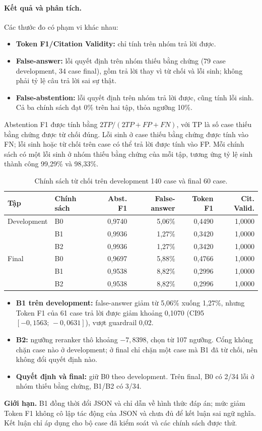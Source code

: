 \paragraph{Kết quả và phân tích.}
Các thước đo có phạm vi khác nhau:
\begin{itemize}
\item \textbf{Token F1/Citation Validity:} chỉ tính trên nhóm trả lời được.
\item \textbf{False-answer:} lỗi quyết định trên nhóm thiếu bằng chứng (79 case development, 34 case final), gồm trả lời thay vì từ chối và lỗi sinh; không phải tỷ lệ câu trả lời sai sự thật.
\item \textbf{False-abstention:} lỗi quyết định trên nhóm trả lời được, cũng tính lỗi sinh. Cả ba chính sách đạt 0\% trên hai tập, thỏa ngưỡng 10\%.
\end{itemize}

Abstention F1 được tính bằng $2TP/(2TP+FP+FN)$, với TP là số case thiếu bằng chứng được từ chối đúng. Lỗi sinh ở case thiếu bằng chứng được tính vào FN; lỗi sinh hoặc từ chối trên case có thể trả lời được tính vào FP. Mỗi chính sách có một lỗi sinh ở nhóm thiếu bằng chứng của mỗi tập, tương ứng tỷ lệ sinh thành công 99,29\% và 98,33\%.
\begin{table}[H]\centering\small{}
\caption{Chính sách từ chối trên development 140 case và final 60 case.}\label{tab:abstention-results}
\begin{tabular}{@{}llrrrr@{}}\toprule
\textbf{Tập} & \textbf{Chính sách} & \textbf{Abst. F1} & \textbf{False-answer} & \textbf{Token F1} & \textbf{Cit. Valid.}\\\midrule
Development & B0 & 0,9740 & 5,06\% & 0,4490 & 1,0000\\
 & B1 & 0,9936 & 1,27\% & 0,3420 & 1,0000\\
 & B2 & 0,9936 & 1,27\% & 0,3420 & 1,0000\\\midrule
Final & B0 & 0,9697 & 5,88\% & 0,4766 & 1,0000\\
 & B1 & 0,9538 & 8,82\% & 0,2996 & 1,0000\\
 & B2 & 0,9538 & 8,82\% & 0,2996 & 1,0000\\\bottomrule
\end{tabular}
\end{table}

\begin{itemize}
\item \textbf{B1 trên development:} false-answer giảm từ 5,06\% xuống 1,27\%, nhưng Token F1 của 61 case trả lời được giảm khoảng 0,1070 (CI95 $[-0{,}1563;\,-0{,}0631]$), vượt guardrail 0,02.
\item \textbf{B2:} ngưỡng reranker thô khoảng $-7{,}8398$, chọn từ 107 ngưỡng. Cổng không chặn case nào ở development; ở final chỉ chặn một case mà B1 đã từ chối, nên không đổi quyết định nào.
\item \textbf{Quyết định và final:} giữ B0 theo development. Trên final, B0 có 2/34 lỗi ở nhóm thiếu bằng chứng, B1/B2 có 3/34.
\end{itemize}

\textbf{Giới hạn.} B1 đồng thời đổi JSON và chỉ dẫn về hình thức đáp án; mức giảm Token F1 không cô lập tác động của JSON và chưa đủ để kết luận sai ngữ nghĩa. Kết luận chỉ áp dụng cho bộ case đã kiểm soát và các chính sách được thử.
